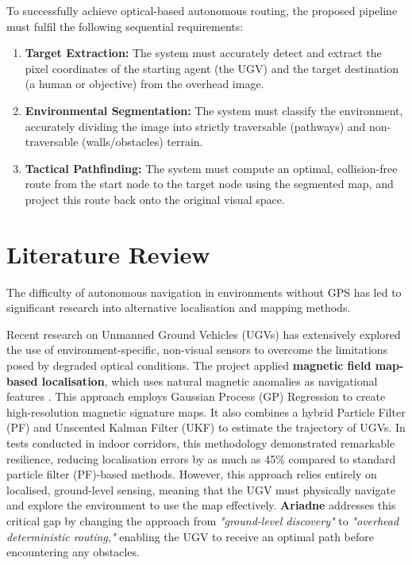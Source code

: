 \documentclass[12pt, a4paper]{article}
\begin{document}
To successfully achieve optical-based autonomous routing, the proposed pipeline must fulfil the following sequential requirements:

\begin{enumerate}
    \item \textbf{Target Extraction:} The system must accurately detect and extract the pixel coordinates of the starting agent (the UGV) and the target destination (a human or objective) from the overhead image.

    \item \textbf{Environmental Segmentation:} The system must classify the environment, accurately dividing the image into strictly traversable (pathways) and non-traversable (walls/obstacles) terrain.

    \item \textbf{Tactical Pathfinding:} The system must compute an optimal, collision-free route from the start node to the target node using the segmented map, and project this route back onto the original visual space.
\end{enumerate}

\vspace{0.5cm}

\section{Literature Review}

The difficulty of autonomous navigation in environments without GPS has led to significant research into alternative localisation and mapping methods. 

\vspace{0.5cm}

Recent research on Unmanned Ground Vehicles (UGVs) has extensively explored the use of environment-specific, non-visual sensors to overcome the limitations posed by degraded optical conditions. The project applied \textbf{magnetic field map-based localisation}, which uses natural magnetic anomalies as navigational features \cite{11219502}. This approach employs Gaussian Process (GP) Regression to create high-resolution magnetic signature maps. It also combines a hybrid Particle Filter (PF) and Unscented Kalman Filter (UKF) to estimate the trajectory of UGVs. In tests conducted in indoor corridors, this methodology demonstrated remarkable resilience, reducing localisation errors by as much as 45\% compared to standard particle filter (PF)-based methods. However, this approach relies entirely on localised, ground-level sensing, meaning that the UGV must physically navigate and explore the environment to use the map effectively. \textbf{Ariadne} addresses this critical gap by changing the approach from \textit{"ground-level discovery"} to \textit{"overhead deterministic routing,"} enabling the UGV to receive an optimal path before encountering any obstacles.
\end{document}
